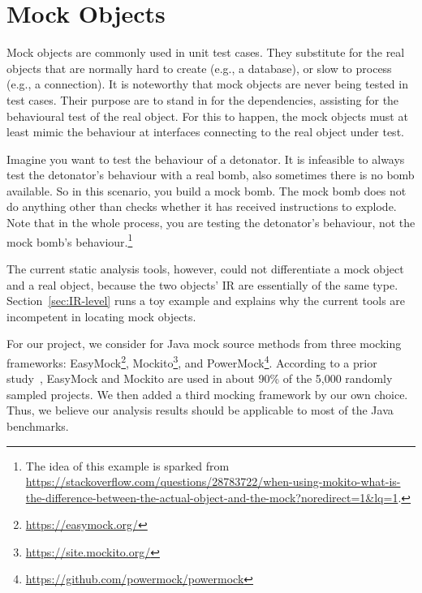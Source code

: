 \section{Mock Objects} 

Mock objects are commonly used in unit test cases. They substitute for the real objects that are normally hard to create (e.g., a database), or slow to process (e.g., a connection). It is noteworthy that mock objects are never being tested in test cases. Their purpose are to stand in for the dependencies, assisting for the behavioural test of the real object. For this to happen, the mock objects must at least mimic the behaviour at interfaces connecting to the real object under test.

Imagine you want to test the behaviour of a detonator. It is infeasible to always test the detonator's behaviour with a real bomb, also sometimes there is no bomb available. So in this scenario, you build a mock bomb. The mock bomb does not do anything other than checks whether it has received instructions to explode. Note that in the whole process, you are testing the detonator's behaviour, not the mock bomb's behaviour.\footnote{The idea of this example is sparked from \url{https://stackoverflow.com/questions/28783722/when-using-mokito-what-is-the-difference-between-the-actual-object-and-the-mock?noredirect=1&lq=1}.}

The current static analysis tools, however, could not differentiate a mock object and a real object, because the two objects' IR are essentially of the same type. Section~\ref{sec:IR-level} runs a toy example and explains why the current tools are incompetent in locating mock objects.

For our project, we consider for Java mock source methods from three mocking frameworks: EasyMock\footnote{\url{https://easymock.org/}}, Mockito\footnote{\url{https://site.mockito.org/}}, and PowerMock\footnote{\url{https://github.com/powermock/powermock}}. According to a prior study~\cite{mostafa14:_empirical_study_mock_frameworks}, EasyMock and Mockito are used in about 90\% of the 5,000 randomly sampled projects. We then added a third mocking framework by our own choice. Thus, we believe our analysis results should be applicable to most of the Java benchmarks. 